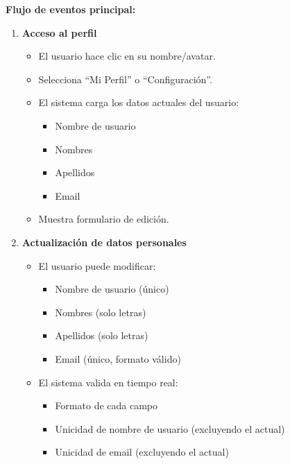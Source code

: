 \vspace{0.5em}
\noindent\textbf{Flujo de eventos principal:}
\begin{enumerate}[nosep]
    \item \textbf{Acceso al perfil}
    \begin{itemize}[nosep]
        \item El usuario hace clic en su nombre/avatar.
        \item Selecciona ``Mi Perfil'' o ``Configuración''.
        \item El sistema carga los datos actuales del usuario:
        \begin{itemize}[nosep]
            \item Nombre de usuario
            \item Nombres
            \item Apellidos
            \item Email
        \end{itemize}
        \item Muestra formulario de edición.
    \end{itemize}

    \item \textbf{Actualización de datos personales}
    \begin{itemize}[nosep]
        \item El usuario puede modificar:
        \begin{itemize}[nosep]
            \item Nombre de usuario (único)
            \item Nombres (solo letras)
            \item Apellidos (solo letras)
            \item Email (único, formato válido)
        \end{itemize}
        \item El sistema valida en tiempo real:
        \begin{itemize}[nosep]
            \item Formato de cada campo
            \item Unicidad de nombre de usuario (excluyendo el actual)
            \item Unicidad de email (excluyendo el actual)
        \end{itemize}
    \end{itemize}


\end{enumerate}
